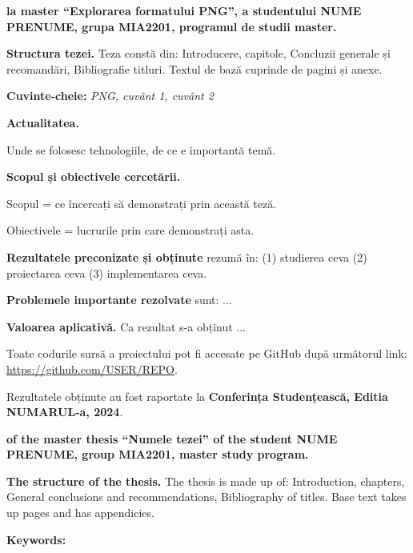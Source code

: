 \documentclass[a4paper,12pt]{report}
\newcommand{\thesisTitleEng}{Numele tezei} %
\newcommand{\uniGroupName}{MIA2201}
\newcommand{\authorName}{NUME PRENUME} %
\newcommand{\thesisTitle}{Explorarea formatului PNG}
\newcommand{\thesisType}{master} %
\newcommand{\programulDeStudii}{master} %
\renewcommand{\year}{2024}
\newcommand{\conferencesList}{Conferința Studențească, Editia NUMARUL-a, \year}
\newcommand{\github}{\url{https://github.com/USER/REPO}}
\begin{document}
\titlePage

\clearpage
\tableofcontents

\clearpage
{} %

\textbf{la \thesisType{} ``\thesisTitle{}'', a studentului \authorName{}, grupa \uniGroupName{}, programul de studii \programulDeStudii.}

\textbf{Structura tezei.}
Teza constă din: Introducere, \chapterCount{} capitole, Concluzii generale și recomandări, Bibliografie \bibliographyEntryCount{} titluri.
Textul de bază cuprinde \usefulPageCount{} de pagini și \anexeCount{} anexe.

\textbf{Cuvinte-cheie:}
\textit{\acs{PNG}, cuvânt 1, cuvânt 2}

\textbf{Actualitatea.}

Unde se folosesc tehnologiile, de ce e importantă temă.

\textbf{Scopul și obiectivele cercetării.}

Scopul = ce încercați să demonstrați prin această teză.

Obiectivele = lucrurile prin care demonstrați asta.

\textbf{Rezultatele preconizate și obținute} rezumă în: 
(1) studierea ceva
(2) proiectarea ceva
(3) implementarea ceva.

\textbf{Problemele importante rezolvate} sunt: ...

\textbf{Valoarea aplicativă.} Ca rezultat s-a obținut ...

Toate codurile sursă a proiectului pot fi accesate pe GitHub după următorul link: \github.

Rezultatele obținute au fost raportate la \textbf{\conferencesList}\cite{self}.

\clearpage
{} %

\textbf{of the \thesisType{} thesis  ``\thesisTitleEng'' of the student \authorName{}, group \uniGroupName{}, \programulDeStudii{} study program.}

\textbf{The structure of the thesis.}
The thesis is made up of: Introduction, \chapterCount{} chapters,
General conclusions and recommendations, Bibliography of \bibliographyEntryCount{} titles.
Base text takes up \usefulPageCount{} pages and has \anexeCount{} appendicies.

\textbf{Keywords:}
\textit{}
\end{document}
